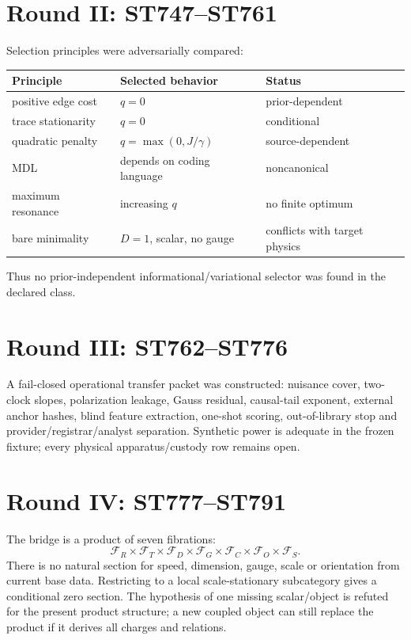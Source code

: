\documentclass[11pt,a4paper]{article}
\begin{document}
\section{Round II: ST747--ST761}
Selection principles were adversarially compared:
\begin{longtable}{@{}p{}p{}p{}@{}}\toprule Principle&Selected behavior&Status\\\midrule\endhead
positive edge cost&$q=0$&prior-dependent\\
trace stationarity&$q=0$&conditional\\
quadratic penalty&$q=\max(0,J/\gamma)$&source-dependent\\
MDL&depends on coding language&noncanonical\\
maximum resonance&increasing $q$&no finite optimum\\
bare minimality&$D=1$, scalar, no gauge&conflicts with target physics\\\bottomrule\end{longtable}
Thus no prior-independent informational/variational selector was found in the declared class.

\section{Round III: ST762--ST776}
A fail-closed operational transfer packet was constructed: nuisance cover, two-clock slopes, polarization leakage, Gauss residual, causal-tail exponent, external anchor hashes, blind feature extraction, one-shot scoring, out-of-library stop and provider/registrar/analyst separation. Synthetic power is adequate in the frozen fixture; every physical apparatus/custody row remains open.

\section{Round IV: ST777--ST791}
The bridge is a product of seven fibrations:
\[
\mathcal F_R\times\mathcal F_T\times\mathcal F_D\times\mathcal F_G\times\mathcal F_C\times\mathcal F_O\times\mathcal F_S.
\]
There is no natural section for speed, dimension, gauge, scale or orientation from current base data. Restricting to a local scale-stationary subcategory gives a conditional zero section. The hypothesis of one missing scalar/object is refuted for the present product structure; a new coupled object can still replace the product if it derives all charges and relations.
\end{document}
